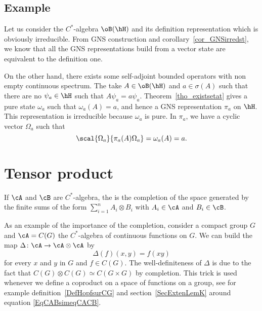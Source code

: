 \subsection{Example}

Let us consider the $C^*$-algebra $\oB(\hH)$ and its definition representation which is obviously irreducible. From GNS construction and corollary~\ref{cor_GNSirredst}, we know that all the GNS representations build from a vector state are equivalent to the definition one.

On the other hand, there exists some self-adjoint bounded operators with non empty continuous spectrum. The take $A\in\oB(\hH)$ and $a\in\sigma(A)$ such that there are no $\psi_a\in\hH$ such that $A\psi_a=a\psi_a$. Theorem~\ref{tho_existsetat} gives a pure state $\omega_a$ such that $\omega_a(A)=a$, and hence a GNS representation $\pi_a$ on $\hH$. This representation is irreducible because $\omega_a$ is pure. In $\pi_a$, we have  a cyclic vector $\Omega_a$ such that
\[
  \scal{\Omega_a}{\pi_a(A)\Omega_a}=\omega_a(A)=a.
\]

\section{Tensor product}            \label{SecTensProdCSA}

If $\cA$ and $\cB$ are $C^*$-algebra, the  is the completion of the space generated by the finite sums of the form $\sum_{i=1}^n A_i\otimes B_i$ with $A_i\in\cA$ and $B_i\in\cB$.

As an example of the importance of the completion, consider a compact group $G$ and $\cA=C(G)$ the $C^*$-algebra of continuous functions on $G$. We can build the map $\Delta\colon \cA\to \cA\otimes \cA$ by
\begin{equation}
    \Delta(f)(x,y)=f(xy)
\end{equation}
for every $x$ and $y$ in $G$ and $f\in C(G)$. The well-definiteness of $\Delta$ is due to the fact that $C(G)\otimes C(G)\simeq C(G\times G)$ by completion. This trick is used whenever we define a coproduct on a space of functions on a group, see for example definition~\ref{DefHopfsurCG} and section~\ref{SecExtenLemK} around equation \eqref{EqCABsimeqCACB}.

